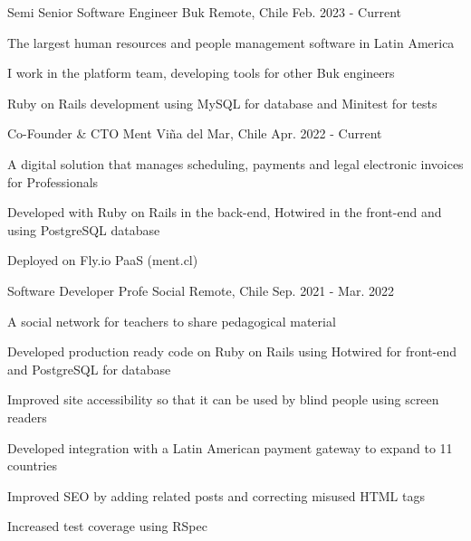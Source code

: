 

\begin{cventries}

  \cventry
    {Semi Senior Software Engineer} %
    {Buk} %
    {Remote, Chile} %
    {Feb. 2023 - Current} %
    {
      \begin{cvitems} %
        \item {The largest human resources and people management software in Latin America}
        \item {I work in the platform team, developing tools for other Buk engineers}
        \item {Ruby on Rails development using MySQL for database and Minitest for tests}
      \end{cvitems}
    }

  \cventry
    {Co-Founder \& CTO} %
    {Ment} %
    {Viña del Mar, Chile} %
    {Apr. 2022 - Current} %
    {
      \begin{cvitems} %
        \item {A digital solution that manages scheduling, payments and legal electronic invoices for Professionals}
        \item {Developed with Ruby on Rails in the back-end, Hotwired in the front-end and using PostgreSQL database}
        \item {Deployed on Fly.io PaaS (ment.cl)}
      \end{cvitems}
    }

  \cventry
    {Software Developer} %
    {Profe Social} %
    {Remote, Chile} %
    {Sep. 2021 - Mar. 2022} %
    {
      \begin{cvitems} %
        \item {A social network for teachers to share pedagogical material}
        \item {Developed production ready code on Ruby on Rails using Hotwired for front-end and PostgreSQL for database}
        \item {Improved site accessibility so that it can be used by blind people using screen readers}
        \item {Developed integration with a Latin American payment gateway to expand to 11 countries}
        \item {Improved SEO by adding related posts and correcting misused HTML tags}
        \item {Increased test coverage using RSpec}
      \end{cvitems}
    }


\end{cventries}
